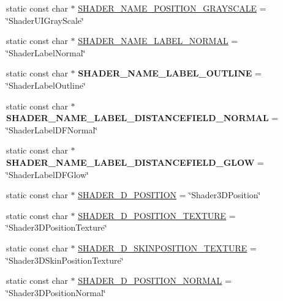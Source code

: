 \begin{Indent}
\begin{DoxyCompactItemize}
\item 
static const char $\ast$ \hyperlink{classGLProgram_aa090c04ba3e2ea8c0820d7b97462de08}{S\+H\+A\+D\+E\+R\+\_\+\+N\+A\+M\+E\+\_\+\+P\+O\+S\+I\+T\+I\+O\+N\+\_\+\+G\+R\+A\+Y\+S\+C\+A\+LE} = \char`\"{}Shader\+U\+I\+Gray\+Scale\char`\"{}
\item 
static const char $\ast$ \hyperlink{classGLProgram_a6590b91db7e35118a0018dedba07f76a}{S\+H\+A\+D\+E\+R\+\_\+\+N\+A\+M\+E\+\_\+\+L\+A\+B\+E\+L\+\_\+\+N\+O\+R\+M\+AL} = \char`\"{}Shader\+Label\+Normal\char`\"{}
\item 
\mbox{\label{classGLProgram_acb5a0467e15e16c2bc2a642a3e655710}} 
static const char $\ast$ {\bfseries S\+H\+A\+D\+E\+R\+\_\+\+N\+A\+M\+E\+\_\+\+L\+A\+B\+E\+L\+\_\+\+O\+U\+T\+L\+I\+NE} = \char`\"{}Shader\+Label\+Outline\char`\"{}
\item 
\mbox{\label{classGLProgram_abd234f00d4f4d5590f2d523b5309968d}} 
static const char $\ast$ {\bfseries S\+H\+A\+D\+E\+R\+\_\+\+N\+A\+M\+E\+\_\+\+L\+A\+B\+E\+L\+\_\+\+D\+I\+S\+T\+A\+N\+C\+E\+F\+I\+E\+L\+D\+\_\+\+N\+O\+R\+M\+AL} = \char`\"{}Shader\+Label\+D\+F\+Normal\char`\"{}
\item 
\mbox{\label{classGLProgram_a8895772732c3da63862aff8db7d8feb6}} 
static const char $\ast$ {\bfseries S\+H\+A\+D\+E\+R\+\_\+\+N\+A\+M\+E\+\_\+\+L\+A\+B\+E\+L\+\_\+\+D\+I\+S\+T\+A\+N\+C\+E\+F\+I\+E\+L\+D\+\_\+\+G\+L\+OW} = \char`\"{}Shader\+Label\+D\+F\+Glow\char`\"{}
\item 
static const char $\ast$ \hyperlink{classGLProgram_a43f2888576cd3c0130bcb439b56cf222}{S\+H\+A\+D\+E\+R\+\_\+D\+\_\+\+P\+O\+S\+I\+T\+I\+ON} = \char`\"{}Shader3\+D\+Position\char`\"{}
\item 
static const char $\ast$ \hyperlink{classGLProgram_ac14625f587ac432a18bb31a2f5e712f8}{S\+H\+A\+D\+E\+R\+\_\+D\+\_\+\+P\+O\+S\+I\+T\+I\+O\+N\+\_\+\+T\+E\+X\+T\+U\+RE} = \char`\"{}Shader3\+D\+Position\+Texture\char`\"{}
\item 
static const char $\ast$ \hyperlink{classGLProgram_aff9d542cbb6cc5ea22f7daaaa40d3ee9}{S\+H\+A\+D\+E\+R\+\_\+D\+\_\+\+S\+K\+I\+N\+P\+O\+S\+I\+T\+I\+O\+N\+\_\+\+T\+E\+X\+T\+U\+RE} = \char`\"{}Shader3\+D\+Skin\+Position\+Texture\char`\"{}
\item 
static const char $\ast$ \hyperlink{classGLProgram_a37c94b205e4883f8e931078812791f50}{S\+H\+A\+D\+E\+R\+\_\+D\+\_\+\+P\+O\+S\+I\+T\+I\+O\+N\+\_\+\+N\+O\+R\+M\+AL} = \char`\"{}Shader3\+D\+Position\+Normal\char`\"{}

\end{DoxyCompactItemize}
\end{Indent}

